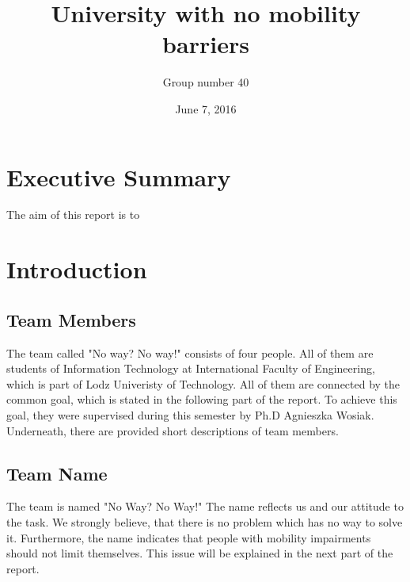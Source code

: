 \documentclass[12pt]{article}
\begin{document}
\begin{titlepage}
\title{University with no mobility barriers}
\date {June 7, 2016}
\author{Group number 40}
\maketitle
{}
\end{titlepage}


\section*{Executive Summary}
The aim of this report is to
\cleardoublepage

\tableofcontents
\thispagestyle{empty}

\newpage

\setcounter{page}{2}
\section{Introduction}
\subsection{Team Members}
The team called "No way? No way!" consists of four people. All of them are students of Information Technology at International Faculty of Engineering, which is part of Lodz Univeristy of Technology.
All of them are connected by the common goal, which is stated in the following part of the report. To achieve this goal, they were supervised during this semester by Ph.D Agnieszka Wosiak. Underneath, there are provided short descriptions of team members.


\subsection{Team Name}
The team is named "No Way? No Way!" The name reflects us and our attitude to the task. We strongly believe, that there is no problem which has no way to solve it. Furthermore, the name indicates that people with mobility impairments should not limit themselves. This issue will be explained in the next part of the report.

\newpage
\end{document}

